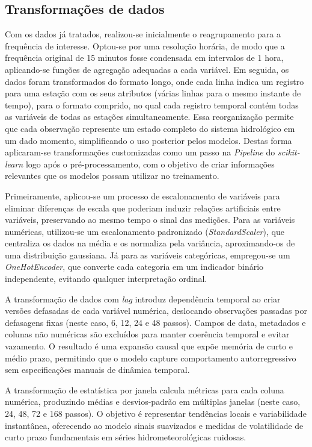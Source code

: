 \subsection{Transformações de dados}
Com os dados já tratados, realizou-se inicialmente o reagrupamento para a frequência de interesse. Optou-se por uma
resolução horária, de modo que a frequência original de 15 minutos fosse condensada em intervalos de 1 hora,
aplicando-se funções de agregação adequadas a cada variável. Em seguida, os dados foram transformados do formato longo,
onde cada linha indica um registro para uma estação com os seus atributos (várias linhas para o mesmo instante de
tempo), para o formato comprido, no qual cada registro temporal contém todas as variáveis de todas as estações
simultaneamente. Essa reorganização permite que cada observação represente um estado completo do sistema hidrológico em
um dado momento, simplificando o uso posterior pelos modelos. Destas forma aplicaram-se transformações customizadas como
um passo na \textit{Pipeline} do \textit{scikit-learn} logo após o pré-processamento, com o objetivo de criar
informações relevantes que os modelos possam utilizar no treinamento.

Primeiramente, aplicou-se um processo de escalonamento de variáveis para eliminar diferenças de escala que poderiam
induzir relações artificiais entre variáveis, preservando ao mesmo tempo o sinal das medições. Para as variáveis
numéricas, utilizou-se um escalonamento padronizado (\textit{StandardScaler}), que centraliza os dados na média e os
normaliza pela variância, aproximando-os de uma distribuição gaussiana. Já para as variáveis categóricas, empregou-se um
\textit{OneHotEncoder}, que converte cada categoria em um indicador binário independente, evitando qualquer
interpretação ordinal.

A transformação de dados com \textit{lag} introduz dependência temporal ao criar versões defasadas de cada variável
numérica, deslocando observações passadas por defasagens fixas (neste caso, 6, 12, 24 e 48 passos). Campos de data,
metadados e colunas não numéricas são excluídos para manter coerência temporal e evitar vazamento. O resultado é uma
expansão causal que expõe memória de curto e médio prazo, permitindo que o modelo capture comportamento autorregressivo
sem especificações manuais de dinâmica temporal.

A transformação de estatística por janela calcula métricas para cada coluna numérica, produzindo médias e desvios-padrão
em múltiplas janelas (neste caso, 24, 48, 72 e 168 passos). O objetivo é representar tendências locais e variabilidade
instantânea, oferecendo ao modelo sinais suavizados e medidas de volatilidade de curto prazo fundamentais em séries
hidrometeorológicas ruidosas.

